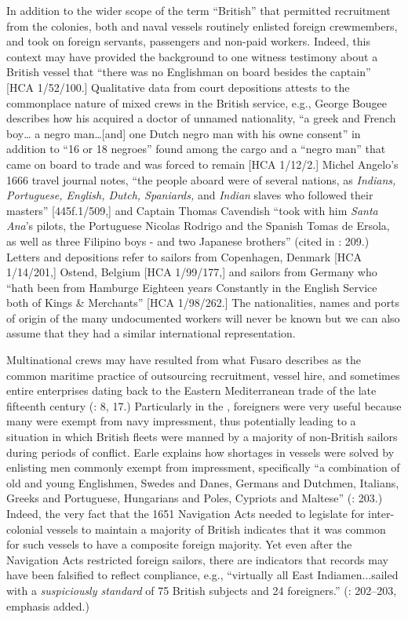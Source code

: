   In addition to the wider scope of the term “British” that permitted recruitment from the colonies, both  and naval vessels routinely enlisted foreign crewmembers, and took on foreign servants, passengers and non-paid workers. Indeed, this context may have provided the background to one witness testimony about a British vessel that “there was no Englishman on board besides the captain” [HCA 1/52/100.] Qualitative data from court depositions attests to the commonplace nature of mixed crews in the British service, e.g., George Bougee describes how his  acquired a doctor of unnamed nationality, “a greek and French boy… a negro man…[and] one Dutch negro man with his owne consent” in addition to “16 or 18 negroes” found among the cargo and a “negro man” that came on board to trade and was forced to remain [HCA 1/12/2.] Michel Angelo’s 1666 travel journal notes, “the people aboard were of several nations, as \textit{Indians, Portuguese, English, Dutch, Spaniards,} and \textit{Indian} slaves who followed their masters” [445f.1/509,] and Captain Thomas Cavendish “took with him \textit{Santa Ana}’s pilots, the Portuguese Nicolas Rodrigo and the Spanish Tomas de Ersola, as well as three Filipino boys - and two Japanese brothers” (cited in \citealt{Bicheno2012}: 209.) Letters and depositions refer to sailors from Copenhagen, Denmark [HCA 1/14/201,] Ostend, Belgium [HCA 1/99/177,] and sailors from Germany who “hath been from Hamburge Eighteen years Constantly in the English Service both of Kings \& Merchants” [HCA 1/98/262.] The nationalities, names and ports of origin of the many undocumented workers will never be known but we can also assume that they had a similar international representation.

Multinational crews may have resulted from what Fusaro describes as the common maritime practice of outsourcing  recruitment, vessel hire, and sometimes entire enterprises dating back to the Eastern Mediterranean trade of the late fifteenth century (\citeyear*{Fusaro2015}: 8, 17.) Particularly in the , foreigners were very useful because many were exempt from navy impressment, thus potentially leading to a situation in which British  fleets were manned by a majority of non-British sailors during periods of conflict. Earle explains how  shortages in  vessels were solved by enlisting men commonly exempt from impressment, specifically “a combination of old and young Englishmen, Swedes and Danes, Germans and Dutchmen, Italians, Greeks and Portuguese, Hungarians and Poles, Cypriots and Maltese” (\citealt{Earle1998}: 203.) Indeed, the very fact that the 1651 Navigation Acts needed to legislate for inter-colonial  vessels to maintain a majority of British  indicates that it was common for such vessels to have a composite foreign majority. Yet even after the Navigation Acts restricted foreign sailors, there are indicators that records may have been falsified to reflect compliance, e.g., “virtually all East Indiamen...sailed with a \textit{suspiciously standard}  of 75 British subjects and 24 foreigners.” (\citealt{Earle1998}: 202--203, emphasis added.) 

